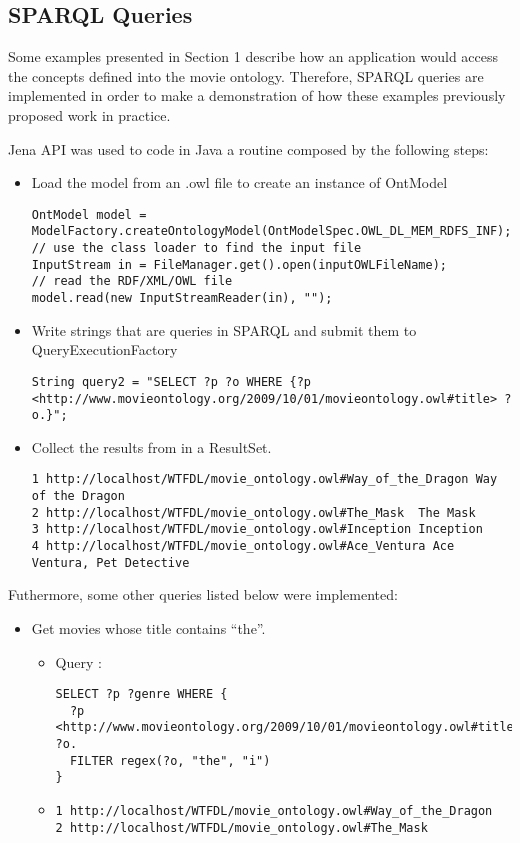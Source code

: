 \subsection{SPARQL Queries}
Some examples presented in Section 1 describe how an application would access the concepts defined into the movie ontology.
Therefore, SPARQL queries are implemented in order to make a demonstration of how these examples previously proposed work in practice.

Jena API was used to code in Java a routine composed by the following steps:

\begin{itemize}
  \item Load the model from an .owl file to create an instance of OntModel
\begin{lstlisting}
OntModel model = ModelFactory.createOntologyModel(OntModelSpec.OWL_DL_MEM_RDFS_INF);
// use the class loader to find the input file
InputStream in = FileManager.get().open(inputOWLFileName);
// read the RDF/XML/OWL file
model.read(new InputStreamReader(in), "");
\end{lstlisting}

  \item Write strings that are queries in SPARQL and submit them to QueryExecutionFactory
\begin{lstlisting}
String query2 = "SELECT ?p ?o WHERE {?p <http://www.movieontology.org/2009/10/01/movieontology.owl#title> ?o.}";
\end{lstlisting}

  \item Collect the results from in a ResultSet.
\begin{lstlisting}
1 http://localhost/WTFDL/movie_ontology.owl#Way_of_the_Dragon Way of the Dragon 
2 http://localhost/WTFDL/movie_ontology.owl#The_Mask  The Mask  
3 http://localhost/WTFDL/movie_ontology.owl#Inception Inception 
4 http://localhost/WTFDL/movie_ontology.owl#Ace_Ventura Ace Ventura, Pet Detective  
\end{lstlisting}

\end{itemize}

Futhermore, some other queries listed below were implemented:

\begin{itemize}
 \item Get movies whose title contains ``the''.
  \begin{itemize}
    \item Query : 
\begin{verbatim}
SELECT ?p ?genre WHERE {
  ?p <http://www.movieontology.org/2009/10/01/movieontology.owl#title> ?o.
  FILTER regex(?o, "the", "i")
}
\end{verbatim}
    \item
      \begin{lstlisting}
1 http://localhost/WTFDL/movie_ontology.owl#Way_of_the_Dragon 
2 http://localhost/WTFDL/movie_ontology.owl#The_Mask  
      \end{lstlisting}
    \end{itemize}

\end{itemize}
